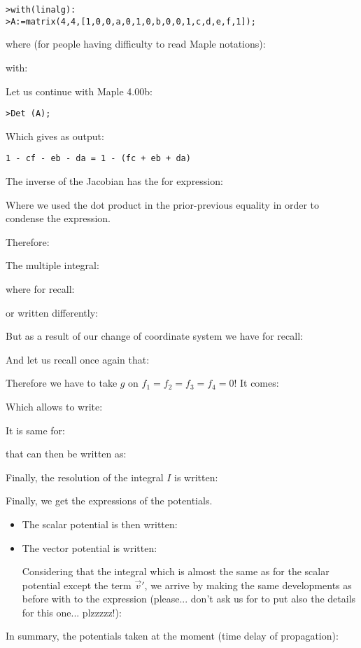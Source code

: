 	\texttt{>with(linalg):\\
	>A:=matrix(4,4,[1,0,0,a,0,1,0,b,0,0,1,c,d,e,f,1]);}
	
	where (for people having difficulty to read Maple notations):
	
	with:
	
	Let us continue with Maple 4.00b:

	\texttt{>Det (A);}
	
	Which gives as output:

	\begin{center}
		\texttt{1 - cf - eb - da = 1 - (fc + eb + da)}
	\end{center}
	The inverse of the Jacobian has the for expression:
	
	Where we used the dot product in the prior-previous equality in order to condense the expression.

	Therefore:
	
	The multiple integral:
	
	where for recall:
	
	or written differently:
	
	But as a result of our change of coordinate system we have for recall:	
	
	And let us recall once again that:
		
	Therefore we have to take $g$ on $f_1=f_2=f_3=f_4=0$! It comes:
	
	Which allows to write:
	
	It is same for:
	
	that can then be written as:
	
	Finally, the resolution of the integral $I$ is written:
	
	Finally, we get the expressions of the potentials.
	\begin{itemize}
		\item The scalar potential is then written:
		

		\item The vector potential is written:
		
		Considering that the integral which is almost the same as for the scalar potential except the term $\vec{v}'$, we arrive by making the same developments as before with to the expression (please... don't ask us for to put also the details for this one... plzzzzz!):
	
	\end{itemize}
	In summary, the potentials taken at the moment (time delay of propagation):
	
